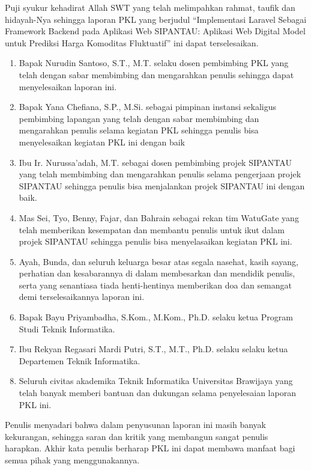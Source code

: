 \documentclass{pkl}
\begin{document}
Puji syukur kehadirat Allah SWT yang telah melimpahkan
rahmat, taufik dan hidayah-Nya sehingga laporan PKL yang berjudul
“Implementasi Laravel Sebagai Framework Backend pada Aplikasi Web SIPANTAU: Aplikasi Web Digital Model untuk Prediksi Harga Komoditas Fluktuatif” ini dapat terselesaikan.

\begin{enumerate}
\item{Bapak Nurudin Santoso, S.T., M.T. selaku dosen pembimbing PKL
    yang telah dengan sabar membimbing dan mengarahkan penulis
    sehingga dapat menyelesaikan laporan ini.}
\item{Bapak Yana Chefiana, S.P., M.Si. sebagai pimpinan instansi sekaligus pembimbing lapangan yang telah dengan sabar membimbing dan mengarahkan penulis selama kegiatan PKL sehingga penulis bisa menyelesaikan kegiatan PKL ini dengan baik}
\item{Ibu Ir. Nurussa’adah, M.T. sebagai dosen pembimbing projek SIPANTAU yang telah membimbing dan mengarahkan penulis selama pengerjaan projek SIPANTAU sehingga penulis bisa menjalankan projek SIPANTAU ini dengan baik.}
\item{Mas Sei, Tyo, Benny, Fajar, dan Bahrain sebagai rekan tim WatuGate yang telah memberikan kesempatan dan membantu penulis untuk ikut dalam projek SIPANTAU sehingga penulis bisa menyelasaikan kegiatan PKL ini.}
\item{Ayah, Bunda, dan seluruh keluarga besar atas segala
    nasehat, kasih sayang, perhatian dan kesabarannya di dalam
    membesarkan dan mendidik penulis, serta yang senantiasa tiada
    henti-hentinya memberikan doa dan semangat demi terselesaikannya
    laporan ini.}
\item{Bapak Bayu Priyambadha, S.Kom., M.Kom., Ph.D. selaku ketua Program
    Studi Teknik Informatika.}
\item{Ibu Rekyan Regasari Mardi Putri, S.T., M.T., Ph.D. selaku selaku ketua Departemen Teknik Informatika.}
\item{Seluruh civitas akademika Teknik Informatika Universitas
    Brawijaya yang telah banyak memberi bantuan dan dukungan selama
    penyelesaian laporan PKL ini.}
\end{enumerate}

Penulis menyadari bahwa dalam penyusunan laporan ini masih banyak kekurangan,
sehingga saran dan kritik yang membangun sangat penulis harapkan. Akhir kata penulis
berharap PKL ini dapat membawa manfaat bagi semua pihak yang menggunakannya.

\vspace{1.5cm}
\end{document}
